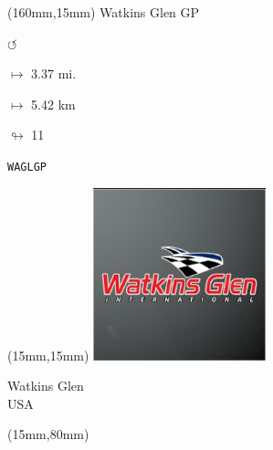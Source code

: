 \begin{textblock*}{40mm}(160mm,15mm)%
Watkins Glen GP
\par \Huge$\circlearrowleft$
\Large
\par$\mapsto$ 3.37 mi.
\par$\mapsto$ 5.42 km
\par$\looparrowright$ 11
\par\hfill\tiny\tt WAGLGP\\
\end{textblock*}
\null\newpage

\begin{textblock*}{50mm}(15mm,15mm)%
\includegraphics[width=50mm]{LG/2015-05-20_00097.png}
\par Watkins Glen\\ USA
\end{textblock*}
\begin{textblock*}{185mm}(15mm,80mm)%
\end{textblock*}
